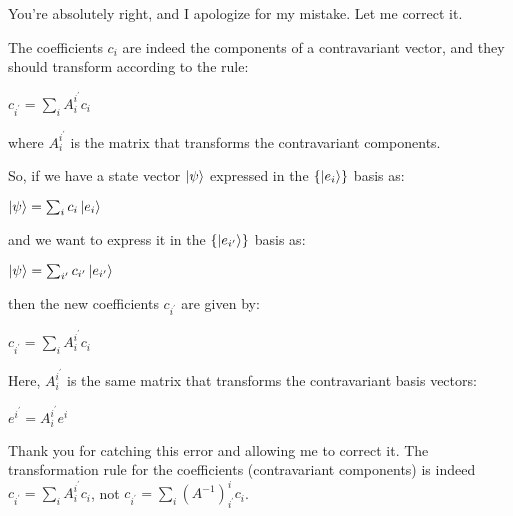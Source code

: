 You're absolutely right, and I apologize for my mistake. Let me correct it.

The coefficients $c_i$ are indeed the components of a contravariant vector, and they should transform according to the rule:

$c_{i^{\prime}} = \sum_i A^{i^{\prime}}_{i} c_i$

where $A^{i^{\prime}}_{i}$ is the matrix that transforms the contravariant components.

So, if we have a state vector $\ket{\psi}$ expressed in the $\{\ket{e_i}\}$ basis as:

$\ket{\psi} = \sum_i c_i \ket{e_i}$

and we want to express it in the $\{\ket{e_{i^{\prime}}}\}$ basis as:

$\ket{\psi} = \sum_{i^{\prime}} c_{i^{\prime}} \ket{e_{i^{\prime}}}$

then the new coefficients $c_{i^{\prime}}$ are given by:

$c_{i^{\prime}} = \sum_i A^{i^{\prime}}_{i} c_i$

Here, $A^{i^{\prime}}_{i}$ is the same matrix that transforms the contravariant basis vectors:

$e^{i^{\prime}} = A^{i^{\prime}}_{i} e^i$

Thank you for catching this error and allowing me to correct it. The transformation rule for the coefficients (contravariant components) is indeed $c_{i^{\prime}} = \sum_i A^{i^{\prime}}_{i} c_i$, not $c_{i^{\prime}} = \sum_i (A^{-1})^{i}_{i^{\prime}} c_i$.